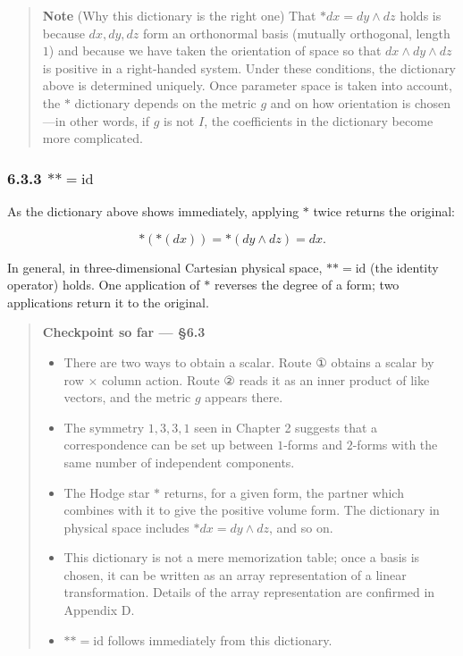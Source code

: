 \begin{quote}
\textbf{Note} (Why this dictionary is the right one) That
\(\ast dx = dy \wedge dz\) holds is because \(dx, dy, dz\) form an
orthonormal basis (mutually orthogonal, length \(1\)) and because we
have taken the orientation of space so that \(dx \wedge dy \wedge dz\)
is positive in a right-handed system. Under these conditions, the
dictionary above is determined uniquely. Once parameter space is taken
into account, the \(\ast\) dictionary depends on the metric \(g\) and on
how orientation is chosen---in other words, if \(g\) is not \(I\), the
coefficients in the dictionary become more complicated.
\end{quote}

\hypertarget{astast-mathrmid}{%
\subsubsection{\texorpdfstring{6.3.3
\(\ast\ast = \mathrm{id}\)}{6.3.3 \textbackslash ast\textbackslash ast = \textbackslash mathrm\{id\}}}\label{astast-mathrmid}}

As the dictionary above shows immediately, applying \(\ast\) twice
returns the original:

\[\ast(\ast(dx)) = \ast(dy \wedge dz) = dx.\]

In general, in three-dimensional Cartesian physical space,
\(\ast\ast = \mathrm{id}\) (the identity operator) holds. One
application of \(\ast\) reverses the degree of a form; two applications
return it to the original.

\begin{quote}
\textbf{Checkpoint so far — §6.3}

\begin{itemize}
\item
  There are two ways to obtain a scalar. Route ① obtains a scalar by row
  \(\times\) column action. Route ② reads it as an inner product of like
  vectors, and the metric \(g\) appears there.
\item
  The symmetry \(1, 3, 3, 1\) seen in Chapter 2 suggests that a
  correspondence can be set up between \(1\)-forms and \(2\)-forms with
  the same number of independent components.
\item
  The Hodge star \(\ast\) returns, for a given form, the partner which
  combines with it to give the positive volume form. The dictionary in
  physical space includes \(\ast dx = dy \wedge dz\), and so on.
\item
  This dictionary is not a mere memorization table; once a basis is
  chosen, it can be written as an array representation of a linear
  transformation. Details of the array representation are confirmed in
  Appendix D.
\item
  \(\ast\ast = \mathrm{id}\) follows immediately from this dictionary.
\end{itemize}
\end{quote}

